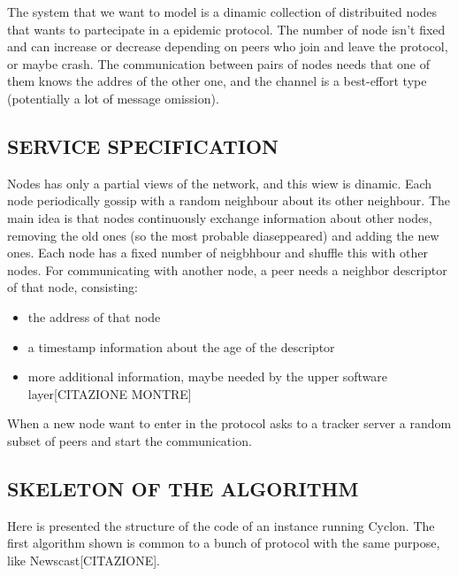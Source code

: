 \documentclass[a4paper,12pt,notitlepage]{article} %
\begin{document}
The system that we want to model is a dinamic collection of distribuited nodes that wants to partecipate in
 a epidemic protocol. The number of node isn't fixed and can increase or decrease depending on peers who
 join and leave the protocol, or maybe crash. 
 The communication between pairs of nodes needs that one 
 of them knows the addres of the other one, and the channel is a best-effort type (potentially a lot of 
 message omission). 


\subsection{SERVICE SPECIFICATION}

Nodes has only a partial views of the network, and this wiew is dinamic. Each node periodically 
 gossip with a random neighbour about its other neighbour. The main idea is that nodes continuously
 exchange information about other nodes, removing the old ones (so the most probable diaseppeared) and
 adding the new ones. Each node has a fixed number of neigbhbour and shuffle this with other nodes.
 For communicating with another node, a peer needs a neighbor descriptor of that node, consisting:

 \begin{itemize}
 	\item the address of that node
 	\item a timestamp information about the age of the descriptor
 	\item more additional information, maybe needed by the upper software layer[CITAZIONE MONTRE]
 \end{itemize}

When a new node want to enter in the protocol asks to a tracker 
 server a random subset of peers and start the communication.

 \subsection{SKELETON OF THE ALGORITHM}	
Here is presented the structure of the code of an instance running Cyclon. The first algorithm shown 
 is common to a bunch of protocol with the same purpose, like Newscast[CITAZIONE].
\end{document}
